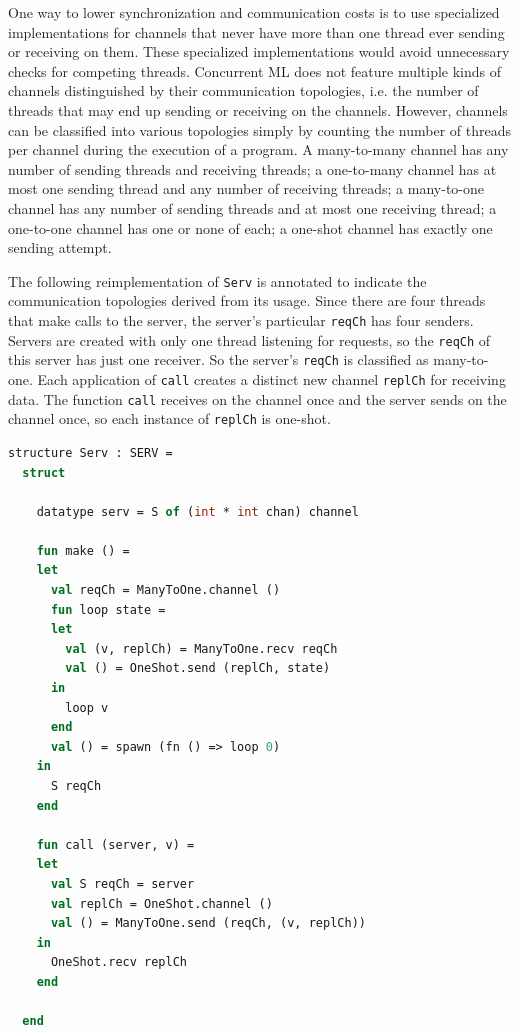 \documentclass[letterpaper, 11pt]{extarticle}
\begin{document}
One way to lower synchronization and communication costs is to use specialized implementations
for channels that never have more than one thread ever sending or receiving on them. These
specialized implementations would avoid unnecessary checks for competing threads.
Concurrent ML does not feature multiple kinds of channels distinguished by their communication
topologies, i.e. the number of threads that may end up sending or receiving on the channels.
However, channels can be classified into various topologies simply by counting the number of
threads per channel during the execution of a program.  A many-to-many channel has any number
of sending threads and receiving threads;
a one-to-many channel has at most one sending thread and
any number of receiving threads;
a many-to-one channel has any number of sending threads and at most one receiving thread;
a one-to-one channel has one or none of each;
a one-shot channel has exactly one sending attempt.

The following reimplementation of \lstinline{Serv} is annotated to indicate the communication topologies
derived from its usage. Since there are four threads that make calls to the server, the
server's particular \lstinline{reqCh} has four senders.  Servers are created with only one
thread listening for requests, so the \lstinline{reqCh} of this server has just one receiver.
So the server's \lstinline{reqCh} is classified as many-to-one.
Each application of \lstinline{call} creates a distinct
new channel \lstinline{replCh} for receiving data.  The function \lstinline{call} receives on the channel
once and the server sends on the channel once, so each instance of \lstinline{replCh} is
one-shot.

\begin{lstlisting}[language=ML, mathescape]
  structure Serv : SERV =
  struct 

    datatype serv = S of (int * int chan) channel 

    fun make () =
    let 
      val reqCh = ManyToOne.channel ()
      fun loop state =
      let
        val (v, replCh) = ManyToOne.recv reqCh
        val () = OneShot.send (replCh, state)
      in
        loop v
      end
      val () = spawn (fn () => loop 0)
    in
      S reqCh
    end 

    fun call (server, v) =
    let 
      val S reqCh = server
      val replCh = OneShot.channel ()
      val () = ManyToOne.send (reqCh, (v, replCh))
    in
      OneShot.recv replCh
    end

  end
\end{lstlisting}
\end{document}
